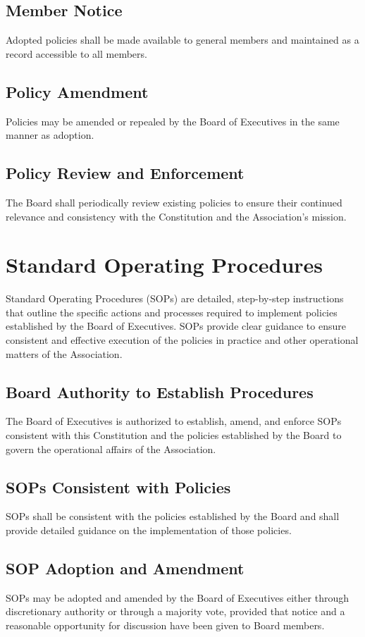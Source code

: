\subsection{Member Notice}
Adopted policies shall be made available to general members and maintained 
as a record accessible to all members.

\subsection{Policy Amendment}
Policies may be amended or repealed by the Board of Executives in the 
same manner as adoption.

\subsection{Policy Review and Enforcement}
The Board shall periodically review existing policies to ensure their continued
relevance and consistency with the Constitution and the Association's mission.

\section{Standard Operating Procedures}

Standard Operating Procedures (SOPs) are detailed, step-by-step instructions
that outline the specific actions and processes required to implement policies
established by the Board of Executives. SOPs provide clear guidance to ensure
consistent and effective execution of the policies in practice and other 
operational matters of the Association.

\subsection{Board Authority to Establish Procedures}
The Board of Executives is authorized to establish, amend, and 
enforce SOPs consistent with this Constitution and the policies
established by the Board to govern the operational affairs of the Association.

\subsection{SOPs Consistent with Policies}
SOPs shall be consistent with the policies established by the Board
and shall provide detailed guidance on the implementation of those policies.

\subsection{SOP Adoption and Amendment}
SOPs may be adopted and amended by the Board of Executives either through
discretionary authority or through a majority vote, provided that notice and a
reasonable opportunity for discussion have been given to Board members.
